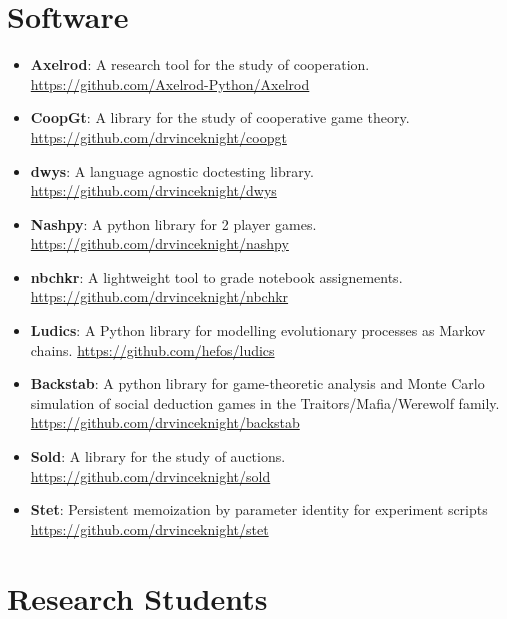 \documentclass[10pt]{article}
\begin{document}
\section{Software}

\begin{itemize}

  \item \textbf{Axelrod}: A research tool for the study of cooperation.
  \url{https://github.com/Axelrod-Python/Axelrod}

  \item \textbf{CoopGt}: A library for the study of cooperative game theory.
  \url{https://github.com/drvinceknight/coopgt}

  \item \textbf{dwys}: A language agnostic doctesting library.
  \url{https://github.com/drvinceknight/dwys}

  \item \textbf{Nashpy}: A python library for 2 player games.
  \url{https://github.com/drvinceknight/nashpy}

  \item \textbf{nbchkr}: A lightweight tool to grade notebook assignements.
  \url{https://github.com/drvinceknight/nbchkr}

  \item \textbf{Ludics}: A Python library for modelling evolutionary processes as Markov chains.
  \url{https://github.com/hefos/ludics}

  \item \textbf{Backstab}: A python library for game-theoretic analysis and Monte Carlo simulation of social deduction games in the Traitors/Mafia/Werewolf family.
  \url{https://github.com/drvinceknight/backstab}

  \item \textbf{Sold}: A library for the study of auctions.
  \url{https://github.com/drvinceknight/sold}

  \item \textbf{Stet}: Persistent memoization by parameter identity for experiment scripts
  \url{https://github.com/drvinceknight/stet}

\end{itemize}

\section{Research Students}
\end{document}
